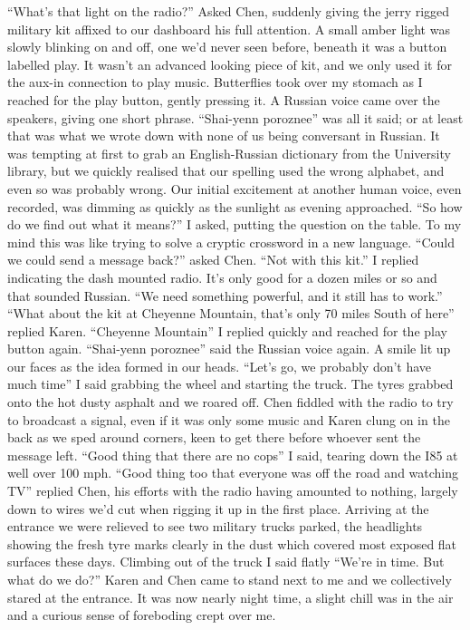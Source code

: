 \documentclass[a4paper]{article}
\begin{document}
“What’s that light on the radio?” Asked Chen, suddenly giving the jerry rigged military kit affixed to our dashboard his full attention. A small amber light was slowly blinking on and off, one we’d never seen before, beneath it was a button labelled play. It wasn’t an advanced looking piece of kit, and we only used it for the aux-in connection to play music.
Butterflies took over my stomach as I reached for the play button, gently pressing it. A Russian voice came over the speakers, giving one short phrase.
“Shai-yenn poroznee” was all it said; or at least that was what we wrote down with none of us being conversant in Russian. It was tempting at first to grab an English-Russian dictionary from the University library, but we quickly realised that our spelling used the wrong alphabet, and even so was probably wrong. Our initial excitement at another human voice, even recorded, was dimming as quickly as the sunlight as evening approached.
“So how do we find out what it means?” I asked, putting the question on the table. To my mind this was like trying to solve a cryptic crossword in a new language.
“Could we could send a message back?” asked Chen.
“Not with this kit.” I replied indicating the dash mounted radio. It’s only good for a dozen miles or so and that sounded Russian. “We need something powerful, and it still has to work.”
“What about the kit at Cheyenne Mountain, that’s only 70 miles South of here” replied Karen.
“Cheyenne Mountain” I replied quickly and reached for the play button again.
“Shai-yenn poroznee” said the Russian voice again. A smile lit up our faces as the idea formed in our heads.
“Let’s go, we probably don’t have much time” I said grabbing the wheel and starting the truck. The tyres grabbed onto the hot dusty asphalt and we roared off. Chen fiddled with the radio to try to broadcast a signal, even if it was only some music and Karen clung on in the back as we sped around corners, keen to get there before whoever sent the message left.
“Good thing that there are no cops” I said, tearing down the I85 at well over 100 mph.
“Good thing too that everyone was off the road and watching TV” replied Chen, his efforts with the radio having amounted to nothing, largely down to wires we’d cut when rigging it up in the first place.
Arriving at the entrance we were relieved to see two military trucks parked, the headlights showing the fresh tyre marks clearly in the dust which covered most exposed flat surfaces these days.
Climbing out of the truck I said flatly “We’re in time. But what do we do?” Karen and Chen came to stand next to me and we collectively stared at the entrance. It was now nearly night time, a slight chill was in the air and a curious sense of foreboding crept over me.
\end{document}
